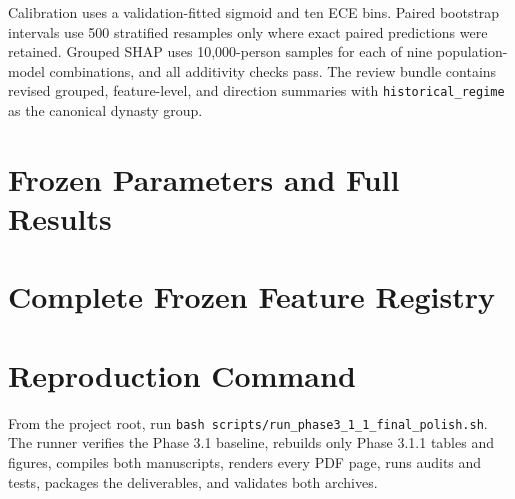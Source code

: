 \documentclass[sigconf]{acmart}
\providecommand{\FloatBarrier}{}
\begin{document}
Calibration uses a validation-fitted sigmoid and ten ECE bins. Paired bootstrap intervals use 500 stratified resamples only where exact paired predictions were retained. Grouped SHAP uses 10,000-person samples for each of nine population-model combinations, and all additivity checks pass. The review bundle contains revised grouped, feature-level, and direction summaries with \texttt{historical\allowbreak\_regime} as the canonical dynasty group.

\FloatBarrier
\section{Frozen Parameters and Full Results}

\begingroup
\renewcommand{\thetable}{A1b}
\renewcommand{\theHtable}{A1b}

\endgroup
\setcounter{table}{1}




\section{Complete Frozen Feature Registry}


\section{Reproduction Command}
From the project root, run \texttt{bash scripts/run\_phase3\_1\_1\_final\_polish.sh}. The runner verifies the Phase 3.1 baseline, rebuilds only Phase 3.1.1 tables and figures, compiles both manuscripts, renders every PDF page, runs audits and tests, packages the deliverables, and validates both archives.
\label{appendixend}
\end{document}
